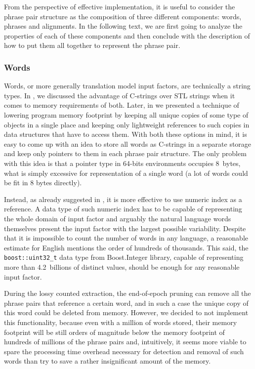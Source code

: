 From the perspective of effective implementation, it is useful to consider the phrase pair structure as
the composition of three different components: words, phrases and alignments.
In the following text, we are first going to analyze the properties of each of these components and
then conclude with the description of how to put them all together to represent the phrase pair.

\subsubsection*{Words}

Words, or more generally translation model input factors, are technically a string types.
In , we discussed the advantage of C-strings over STL strings when it comes 
to memory requirements of both.
Later, in  we presented a technique of lowering program memory
footprint by keeping all unique copies of some type of objects in a single place and keeping
only lightweight references to such copies in data structures that have to access them.
With both these options in mind, it is easy to come up with an idea to store all words as
C-strings in a separate storage and keep only pointers to them in each phrase pair structure.
The only problem with this idea is that a pointer type in 64-bits environments occupies
8~bytes, what is simply excessive for representation of a single word (a lot of words could
be fit in 8 bytes directly).

Instead, as already suggested in , it is more effective to
use numeric index as a reference.
A data type of such numeric index has to be capable of representing the whole domain of
input factor and arguably the natural language words themselves present the input factor with
the largest possible variability.
Despite that it is impossible to count the number of words in any language, a reasonable estimate
for English mentions the order of hundreds of thousands.
This said, the \texttt{boost::uint32_t} data type from Boost.Integer library, capable of representing
more than 4.2~billions of distinct values, should be enough for any reasonable input factor.

During the lossy counted extraction, the end-of-epoch pruning can remove all the phrase pairs that
reference a certain word, and in such a case the unique copy of this word could be deleted from memory.
However, we decided to not implement this functionality, because even with a million of words stored,
their memory footprint will be still orders of magnitude below the memory footprint of hundreds of
millions of the phrase pairs and, intuitively, it seems more viable to spare the processing time
overhead necessary for detection and removal of such words than try to save a rather insignificant
amount of the memory.

